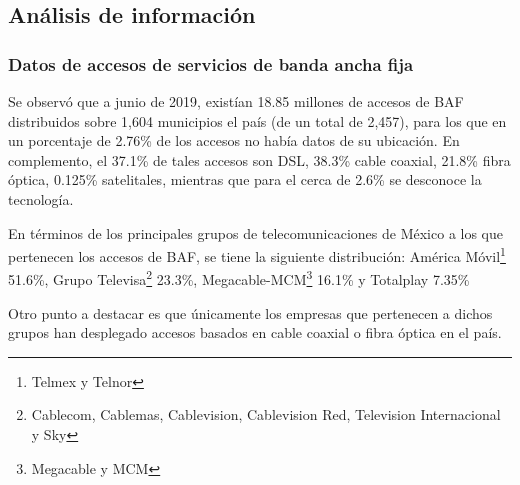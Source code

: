\documentclass[9pt,twocolumn,twoside]{ilcss}
\begin{document}
\subsection{Análisis de información}

\subsubsection{Datos de accesos de servicios de banda ancha fija}
Se observó que a junio de 2019, existían 18.85 millones de accesos de BAF distribuidos sobre 1,604 municipios el país (de un total de 2,457), para los que en un porcentaje de 2.76\% de los accesos no había datos de su ubicación. En complemento, el 37.1\% de tales accesos son DSL, 38.3\% cable coaxial, 21.8\% fibra óptica, 0.125\% satelitales, mientras que para el cerca de 2.6\% se desconoce la tecnología.

En términos de los principales grupos de telecomunicaciones de México a los que pertenecen los accesos de BAF, se tiene la siguiente distribución: América Móvil\footnote{Telmex y Telnor}  51.6\%, Grupo Televisa\footnote{Cablecom, Cablemas, Cablevision, Cablevision Red, Television Internacional y Sky} 23.3\%, Megacable-MCM\footnote{Megacable y MCM}  16.1\% y Totalplay 7.35\%  

Otro punto a destacar es que únicamente los empresas que pertenecen a dichos grupos han desplegado accesos basados en cable coaxial o fibra óptica en el país.%

\end{document}
